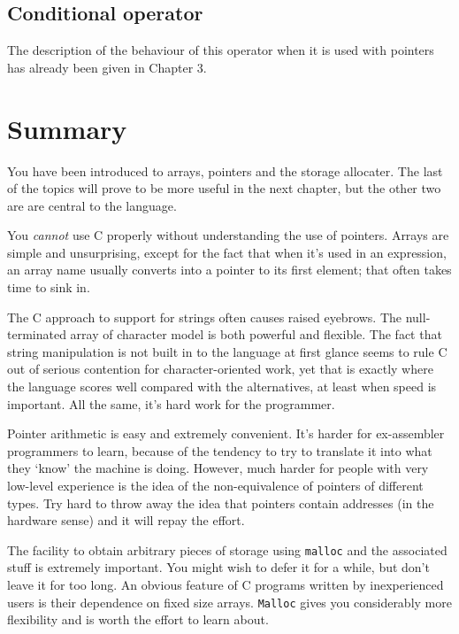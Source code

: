  

  \subsection{Conditional operator}
   

   The description of the behaviour of this operator when it is used with
     pointers has already been given in Chapter 3.


  

 
        \section{Summary}
        


  You have been introduced to arrays, pointers and the storage allocater.
   The last of the topics will prove to be more useful in the next chapter,
   but the other two are are central to the language.


  You \textit{cannot} use C properly without understanding the use of
   pointers. Arrays are simple and unsurprising, except for the fact that
   when it's used in an expression, an array name usually converts into
   a pointer to its first element; that often takes time to sink in.


  The C approach to support for strings often causes raised eyebrows. The
   null-terminated array of character model is both powerful and flexible.
   The fact that string manipulation is not built in to the language at
   first glance seems to rule C out of serious contention for
   character-oriented work, yet that is exactly where the language scores
   well compared with the alternatives, at least when speed is important.
   All the same, it's hard work for the programmer.


  Pointer arithmetic is easy and extremely convenient. It's harder for
   ex-assembler programmers to learn, because of the tendency to try to
   translate it into what they `know' the machine is doing. However,
   much harder for people with very low-level experience is the idea of the
   non-equivalence of pointers of different types. Try hard to throw away
   the idea that pointers contain addresses (in the hardware sense) and it
   will repay the effort.


  The facility to obtain arbitrary pieces of storage using
   \texttt{malloc} and the associated stuff is extremely important. You
   might wish to defer it for a while, but don't leave it for too long. An
   obvious feature of C programs written by inexperienced users is their
   dependence on fixed size arrays. \texttt{Malloc} gives you
   considerably more flexibility and is worth the effort to learn about.


